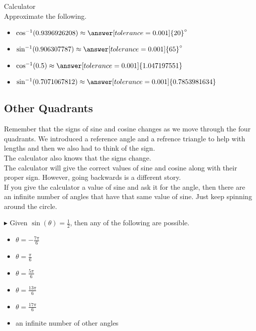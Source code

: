 \documentclass{ximera}
\begin{document}
\begin{question} Calculator \\

Approximate the following.

\begin{itemize}
\item $\cos^{-1}(0.9396926208) \approx \answer[tolerance=0.001]{20}^{\circ}$
\item $\sin^{-1}(0.906307787) \approx \answer[tolerance=0.001]{65}^{\circ}$
\item $\cos^{-1}(0.5) \approx \answer[tolerance=0.001]{1.047197551}$
\item $\sin^{-1}(0.7071067812) \approx \answer[tolerance=0.001]{0.7853981634}$
\end{itemize}

\end{question}




\subsection*{Other Quadrants}

Remember that the signs of sine and cosine changes as we move through the four quadrants.  We introduced a reference angle and a refrence triangle to help with lengths and then we also had to think of the sign. \\

The calculator also knows that the signs change. \\

The calculator will give the correct values of sine and cosine along with their proper sign.  However, going backwards is a different story. \\

If you give the calculator a value of sine and ask it for the angle, then there are an infinite number of angles that have that same value of sine.  Just keep spinning around the circle. 



\begin{example}

$\blacktriangleright$ Given  $\sin(\theta) = \frac{1}{2}$, then any of the following are possible.


\begin{itemize}
\item $\theta = -\frac{7\pi}{6}$
\item $\theta = \frac{\pi}{6}$
\item $\theta = \frac{5\pi}{6}$
\item $\theta = \frac{13\pi}{6}$
\item $\theta = \frac{17\pi}{6}$
\item an infinite number of other angles
\end{itemize}


\end{example}
\end{document}
